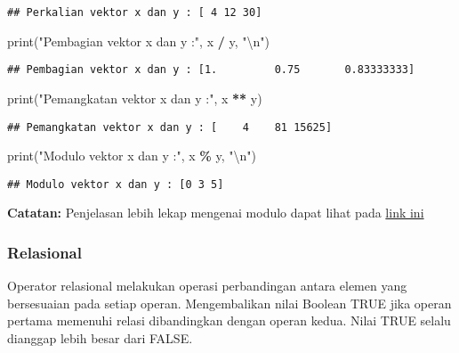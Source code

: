 \documentclass[
]{docs}
\newenvironment{Shaded}{\begin{snugshade}}{\end{snugshade}}
\newcommand{\BuiltInTok}[1]{#1}
\newcommand{\CharTok}[1]{\textcolor[rgb]{0.31,0.60,0.02}{#1}}
\newcommand{\NormalTok}[1]{#1}
\newcommand{\OperatorTok}[1]{\textcolor[rgb]{0.81,0.36,0.00}{\textbf{#1}}}
\newcommand{\StringTok}[1]{\textcolor[rgb]{0.31,0.60,0.02}{#1}}
\begin{document}
\begin{verbatim}
## Perkalian vektor x dan y : [ 4 12 30]
\end{verbatim}

\begin{Shaded}
\begin{Highlighting}[]
\BuiltInTok{print}\NormalTok{(}\StringTok{"Pembagian vektor x dan y :"}\NormalTok{, x }\OperatorTok{/}\NormalTok{ y, }\StringTok{"}\CharTok{\textbackslash{}n}\StringTok{"}\NormalTok{)}
\end{Highlighting}
\end{Shaded}

\begin{verbatim}
## Pembagian vektor x dan y : [1.         0.75       0.83333333]
\end{verbatim}

\begin{Shaded}
\begin{Highlighting}[]
\BuiltInTok{print}\NormalTok{(}\StringTok{"Pemangkatan vektor x dan y :"}\NormalTok{, x }\OperatorTok{**}\NormalTok{ y) }
\end{Highlighting}
\end{Shaded}

\begin{verbatim}
## Pemangkatan vektor x dan y : [    4    81 15625]
\end{verbatim}

\begin{Shaded}
\begin{Highlighting}[]
\BuiltInTok{print}\NormalTok{(}\StringTok{"Modulo vektor x dan y :"}\NormalTok{, x }\OperatorTok{\%}\NormalTok{ y, }\StringTok{"}\CharTok{\textbackslash{}n}\StringTok{"}\NormalTok{)}
\end{Highlighting}
\end{Shaded}

\begin{verbatim}
## Modulo vektor x dan y : [0 3 5]
\end{verbatim}

\textbf{Catatan:} Penjelasan lebih lekap mengenai modulo dapat lihat pada \href{https://www.omnicalculator.com/math/modulo}{link ini}

\hypertarget{relasional}{%
\subsubsection{Relasional}\label{relasional}}

Operator relasional melakukan operasi perbandingan antara elemen yang bersesuaian pada setiap operan. Mengembalikan nilai Boolean TRUE jika operan pertama memenuhi relasi dibandingkan dengan operan kedua. Nilai TRUE selalu dianggap lebih besar dari FALSE.
\end{document}
